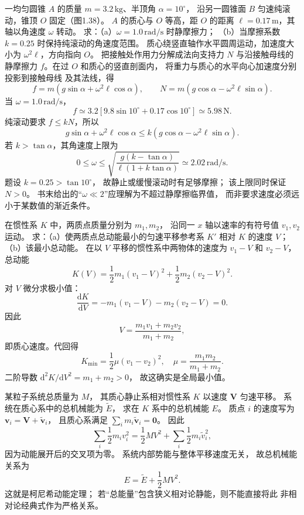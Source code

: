 一均匀圆锥 $A$ 的质量
$m=3.2\,\mathrm{kg}$、半顶角 $\alpha=10^\circ$，
沿另一圆锥面 $B$ 匀速纯滚动，锥顶 $O$ 固定（图1.38）。
$A$ 的质心与 $O$ 等高，距 $O$ 的距离
$\ell=0.17\,\mathrm m$，其轴以角速度 $\omega$ 转动。
求：（a）$\omega=1.0\,\mathrm{rad/s}$ 时静摩擦力；
（b）当摩擦系数 $k=0.25$ 时保持纯滚动的角速度范围。
\exsolution
质心绕竖直轴作水平圆周运动，加速度大小为
$\omega^2\ell$，方向指向 $O$。
把接触处作用力分解成法向支持力 $N$ 与沿接触母线的
静摩擦力 $f$。在过 $O$ 和质心的竖直剖面内，
将重力与质心的水平向心加速度分别投影到接触母线
及其法线，得
\[
\boxed{f=m(g\sin\alpha+\omega^2\ell\cos\alpha)},\qquad
\boxed{N=m(g\cos\alpha-\omega^2\ell\sin\alpha)}.
\]
当 $\omega=1.0\,\mathrm{rad/s}$，
\[
\boxed{f\simeq
3.2[9.8\sin10^\circ+0.17\cos10^\circ]
\simeq5.98\,\mathrm N}.
\]
纯滚动要求 $f\le kN$，所以
\[
g\sin\alpha+\omega^2\ell\cos\alpha
\le k(g\cos\alpha-\omega^2\ell\sin\alpha).
\]
若 $k>\tan\alpha$，其角速度上限为
\[
\boxed{0\le\omega\le
\sqrt{\frac{g(k-\tan\alpha)}
{\ell(1+k\tan\alpha)}}\simeq2.02\,\mathrm{rad/s}}.
\]
\excheck 题设 $k=0.25>\tan10^\circ$，
故静止或缓慢滚动时有足够摩擦；
该上限同时保证 $N>0$。
书末给出的“$\omega\ll2$”应理解为不超过静摩擦临界值，
而非要求速度必须远小于某数值的渐近条件。

在惯性系 $K$ 中，两质点质量分别为 $m_1,m_2$，
沿同一 $x$ 轴以速率的有符号值 $v_1,v_2$ 运动。
求：（a）使两质点总动能最小的匀速平移参考系 $K'$
相对 $K$ 的速度 $V$；
（b）该最小总动能。
\exsolution
在以 $V$ 平移的惯性系中两物体的速度为
$v_1-V$ 和 $v_2-V$，总动能
\[
K(V)=\frac12m_1(v_1-V)^2+
\frac12m_2(v_2-V)^2.
\]
对 $V$ 微分求极小值：
\[
\frac{\mathrm dK}{\mathrm dV}
=-m_1(v_1-V)-m_2(v_2-V)=0.
\]
因此
\[
\boxed{V=\frac{m_1v_1+m_2v_2}{m_1+m_2}},
\]
即质心速度。代回得
\[
\boxed{K_{\min}=
\frac12\mu(v_1-v_2)^2},\quad
\mu=\frac{m_1m_2}{m_1+m_2}.
\]
\excheck 二阶导数
$\mathrm d^2K/\mathrm dV^2=m_1+m_2>0$，
故这确实是全局最小值。

某粒子系统总质量为 $M$，
其质心静止系相对惯性系 $K$ 以速度 $\bm V$ 匀速平移。
系统在质心系中的总机械能为 $\widetilde E$，
求在 $K$ 系中的总机械能 $E$。
\exsolution
质点 $i$ 的速度写为
$\bm v_i=\bm V+\widetilde{\bm v}_i$，
且质心系满足
$\sum_i m_i\widetilde{\bm v}_i=\bm0$。
因此
\[
\sum_i\frac12m_i v_i^2
=\frac12M V^2+
\sum_i\frac12m_i\widetilde v_i^2,
\]
因为动能展开后的交叉项为零。
系统内部势能与整体平移速度无关，
故总机械能关系为
\[
\boxed{E=\widetilde E+\frac12M V^2}.
\]
\excheck 这就是柯尼希动能定理；
若“总能量”包含狭义相对论静能，则不能直接将此
非相对论经典式作为严格关系。

